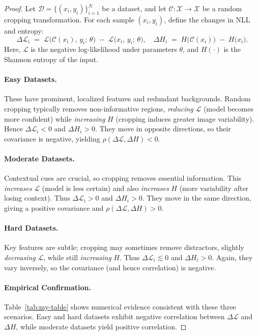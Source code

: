 \begin{proof}
Let \( \mathcal{D} = \{(x_i,y_i)\}_{i=1}^N \) be a dataset, and let 
\( \mathcal{C}:\mathcal{X}\to\mathcal{X} \) be a random cropping transformation. 
For each sample \( (x_i,y_i) \), define the changes in NLL and entropy:
\[
\Delta\mathcal{L}_i 
\;=\;
\mathcal{L}\bigl(\mathcal{C}(x_i),\,y_i;\,\theta\bigr) 
\;-\;
\mathcal{L}\bigl(x_i,\,y_i;\,\theta\bigr),
\quad
\Delta H_i 
\;=\;
H\bigl(\mathcal{C}(x_i)\bigr) 
\;-\;
H\bigl(x_i\bigr).
\]
Here, \( \mathcal{L} \) is the negative log-likelihood under parameters \( \theta \), 
and \( H(\cdot) \) is the Shannon entropy of the input.

\paragraph{Easy Datasets.}
These have prominent, localized features and redundant backgrounds. 
Random cropping typically removes non-informative regions, 
\emph{reducing} \(\mathcal{L}\) (model becomes more confident) 
while \emph{increasing} \(H\) (cropping induces greater image variability). 
Hence \(\Delta\mathcal{L}_i < 0\) and \(\Delta H_i > 0\). 
They move in opposite directions, so their covariance is negative, 
yielding
\(\rho(\Delta\mathcal{L}, \Delta H) < 0\).

\paragraph{Moderate Datasets.}
Contextual cues are crucial, so cropping removes essential information. 
This \emph{increases} \(\mathcal{L}\) (model is less certain) and 
also \emph{increases} \(H\) (more variability after losing context). 
Thus \(\Delta\mathcal{L}_i > 0\) and \(\Delta H_i > 0\). 
They move in the same direction, giving a positive covariance 
and 
\(\rho(\Delta\mathcal{L}, \Delta H) > 0\).

\paragraph{Hard Datasets.}
Key features are subtle; cropping may sometimes remove distractors, 
slightly \emph{decreasing} \(\mathcal{L}\), while still \emph{increasing} 
\(H\). Thus \(\Delta\mathcal{L}_i \lesssim 0\) and \(\Delta H_i > 0\). 
Again, they vary inversely, so the covariance (and hence correlation) 
is negative.

\paragraph{Empirical Confirmation.}
Table~\ref{tab:my-table} shows numerical evidence consistent with these 
three scenarios. Easy and hard datasets exhibit negative correlation 
between \(\Delta\mathcal{L}\) and \(\Delta H\), while moderate datasets 
yield positive correlation.


\end{proof}
